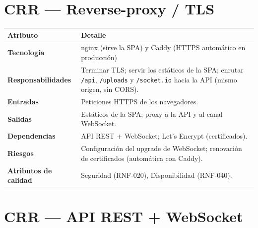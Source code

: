 \section{CRR --- Reverse-proxy / TLS}

\begin{tabularx}{\textwidth}{>{\bfseries}L{3.5cm} X}
  \toprule
  \textbf{\color{fmAccent}Atributo} & \textbf{\color{fmAccent}Detalle} \\
  \midrule
  Tecnología & nginx (sirve la SPA) y Caddy (HTTPS automático en producción) \\
  Responsabilidades & Terminar TLS; servir los estáticos de la SPA; enrutar \texttt{/api}, \texttt{/uploads} y \texttt{/socket.io} hacia la API (mismo origen, sin CORS). \\
  Entradas & Peticiones HTTPS de los navegadores. \\
  Salidas & Estáticos de la SPA; proxy a la API y al canal WebSocket. \\
  Dependencias & API REST + WebSocket; Let's Encrypt (certificados). \\
  Riesgos & Configuración del upgrade de WebSocket; renovación de certificados (automática con Caddy). \\
  Atributos de calidad & Seguridad (RNF-020), Disponibilidad (RNF-040). \\
  \bottomrule
\end{tabularx}

\section{CRR --- API REST + WebSocket}

